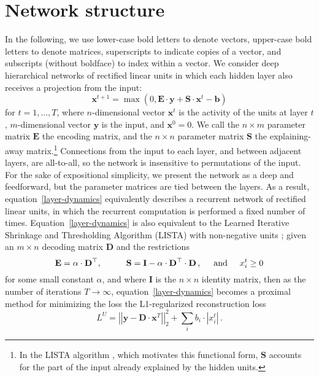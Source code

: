 \documentclass{article} %
\newcommand{\bv}{\mathbf{b}}
\newcommand{\x}{\mathbf{x}}
\newcommand{\y}{\mathbf{y}}
\newcommand{\D}{\mathbf{D}}
\newcommand{\E}{\mathbf{E}}
\newcommand{\I}{\mathbf{I}}
\newcommand{\Sm}{\mathbf{S}}
\begin{document}

\section{Network structure}

In the following, we use lower-case bold letters to denote vectors, upper-case bold letters to denote matrices, superscripts to indicate copies of a vector, and subscripts (without boldface) to index within a vector.
We consider deep hierarchical networks of rectified linear units in which each hidden layer also receives a projection from the input:
\begin{equation} \label{layer-dynamics}
\x^{t+1} = \max\left(0, \E \cdot \y + \Sm \cdot \x^t - \bv \right)
\end{equation}
for $t = 1, \ldots, T$, where $n$-dimensional vector $\x^t$ is the activity of the units at layer $t$, $m$-dimensional vector $\y$ is the input, and $\x^0 = 0$.  We call the $n \times m$ parameter matrix $\E$ the encoding matrix, and the $n \times n$ parameter matrix $\Sm$ the explaining-away matrix.\footnote{In the LISTA algorithm \cite{gregor2010}, which motivates this functional form, $\Sm$ accounts for the part of the input already explained by the hidden units.}
Connections from the input to each layer, and between adjacent layers, are all-to-all, so the network is insensitive to permutations of the input.    
For the sake of expositional simplicity, we present the network as a deep and feedforward, but the parameter matrices are tied between the layers.  As a result, equation~\ref{layer-dynamics} equivalently describes a recurrent network of rectified linear units, in which the recurrent computation is performed a fixed number of times.  Equation~\ref{layer-dynamics} is also equivalent to the Learned Iterative Shrinkage and Thresholding Algorithm (LISTA) with non-negative units \cite{gregor2010}; given an $m \times n$ decoding matrix $\D$ and the restrictions
\begin{equation*}
\E = \alpha \cdot \D^{\top} , \hspace{1cm}
\Sm = \I - \alpha \cdot \D^{\top} \cdot \D \, , \hspace{0.5cm}
\text{and} \hspace{0.5cm} x_i^t \geq 0
\end{equation*}
for some small constant $\alpha$, and where $\I$ is the $n \times n$ identity matrix, then as the number of iterations $T \rightarrow \infty$, equation~\ref{layer-dynamics} becomes a proximal method for minimizing the loss the L1-regularized reconstruction loss 
\begin{equation} \label{reconstruction-loss}
L^U = \left| \left| \y - \D \cdot \x^T \right| \right|_2^2 + \sum_i b_i \cdot \left| x_i^t \right| \, .
\end{equation}
\end{document}
